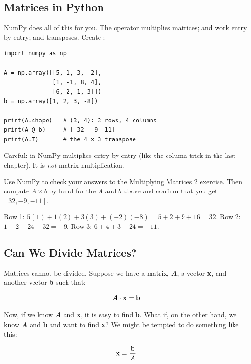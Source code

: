 \subsection{Matrices in Python}

NumPy does all of this for you. The  operator multiplies
matrices; \pyfunction{+} and \pyfunction{-} work entry by entry; and
 transposes. Create :

\begin{verbatim}
import numpy as np

A = np.array([[5, 1, 3, -2],
              [1, -1, 8, 4],
              [6, 2, 1, 3]])
b = np.array([1, 2, 3, -8])

print(A.shape)   # (3, 4): 3 rows, 4 columns
print(A @ b)     # [ 32  -9 -11]
print(A.T)       # the 4 x 3 transpose
\end{verbatim}

Careful:  in NumPy multiplies entry by entry (like the
column trick in the last chapter). It is \emph{not} matrix multiplication.

\begin{Exercise}[title={Check Your Work}, label=vm_python]
Use NumPy to check your answers to the Multiplying Matrices 2 exercise.
Then compute $A \times b$ by hand for the $A$ and $b$ above and confirm that
you get $[32, -9, -11]$.
\end{Exercise}
\begin{Answer}[ref=vm_python]
Row 1: $5(1) + 1(2) + 3(3) + (-2)(-8) = 5 + 2 + 9 + 16 = 32$.
Row 2: $1 - 2 + 24 - 32 = -9$. Row 3: $6 + 4 + 3 - 24 = -11$.
\end{Answer}

\subsection{Can We Divide Matrices?}
Matrices cannot be divided. Suppose we have a matrix, \textbf{\textit{A}}, a vector \textbf{x}, and another vector \textbf{b} such that:

$$\textbf{\textit{A}} \cdot \textbf{x} = \textbf{b}$$

Now, if we know \textbf{\textit{A}} and \textbf{x}, it is easy to find \textbf{b}. What if, on the other hand, we know \textbf{\textit{A}} and \textbf{b} and want to find \textbf{x}? We might be tempted to do something like this:

$$\textbf{x} = \frac{\textbf{b}}{\textbf{\textit{A}}}$$


